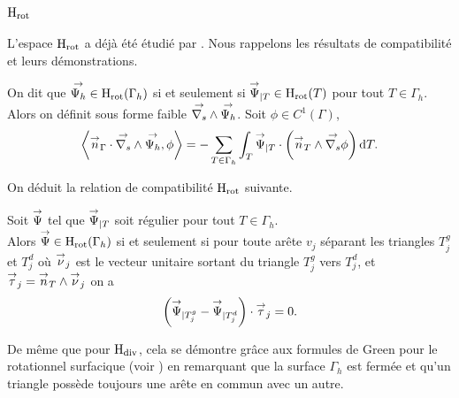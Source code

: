\subsection[Hrot]{\(\mathrm{H}_\mathrm{rot}\)}

L'espace \(\mathrm{H}_\mathrm{rot}\) a déjà été étudié par \cite[Lemme.~ 6]{nedelec_mixed_1980}.
Nous rappelons les résultats de compatibilité et leurs démonstrations.

\begin{defn}
    On dit que \({\overset{\rightarrow}{\Psi_h}} \in \mathrm{H}_\mathrm{rot}(\Gamma_h)\) si et seulement si \({\overset{\rightarrow}{\Psi}}_{|T} \in \mathrm{H}_\mathrm{rot}(T)\) pour tout \(T \in \Gamma_h\).\\
    Alors on définit sous forme faible \({\overset{\rightarrow}{\nabla_s}} \wedge {\overset{\rightarrow}{\Psi_h}} \).
    Soit \(\phi \in C^1(\Gamma)\),
    \begin{equation*}
        \left< \vn_\Gamma \cdot \vrots \vect{\Psi_h}, \phi \right> %
        = - \sum_{T\in\Gamma_h} \int_T \vect{\Psi}_{|T}  \cdot \left( \vn_T \pvect \vgrads \phi \right) \dd{T}.
    \end{equation*}
\end{defn}

On déduit la relation de compatibilité \(\mathrm{H}_\mathrm{rot}\) suivante.
\begin{prop}
    \label{prop:annex:hdiv_hrot:hrot}
    Soit \({\overset{\rightarrow}{\Psi}}\) tel que \({\overset{\rightarrow}{\Psi}}_{|T}\) soit régulier pour tout \(T\in\Gamma_h\).\\
    Alors \({\overset{\rightarrow}{\Psi}} \in \mathrm{H}_\mathrm{rot}(\Gamma_h)\) si et seulement si pour toute arête \(v_j\) séparant les triangles \(T_j^g\) et \(T_j^d\) où \({\overset{\rightarrow}{\nu}}_j\) est le vecteur unitaire sortant du triangle \(T_j^g\) vers \(T_j^d\), et \({\overset{\rightarrow}{\tau}}_j = {\overset{\rightarrow}{n}}_T \wedge {\overset{\rightarrow}{\nu}}_j\) on a
    \begin{equation*}
        \left({\overset{\rightarrow}{\Psi}}_{|T_j^g} - {\overset{\rightarrow}{\Psi}}_{|T_j^d} \right) \cdot {\overset{\rightarrow}{\tau}}_j = 0.
    \end{equation*}
\end{prop}

De même que pour \(\mathrm{H}_\mathrm{div}\), cela se démontre grâce aux formules de Green pour le rotationnel surfacique (voir \cite[eq.~(A3.57)]{bladel_electromagnetic_2007}) en remarquant que la surface \(\Gamma_h\) est fermée et qu'un triangle possède toujours une arête en commun avec un autre.

